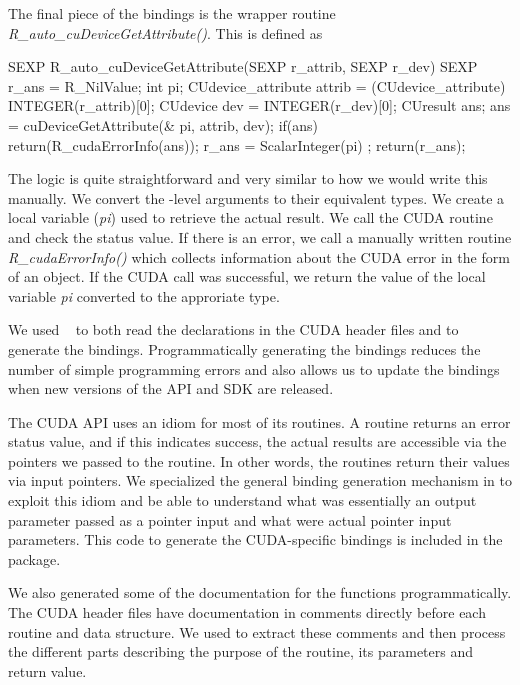 \documentclass[article]{jss}
\def\C{\proglang{C}}
\def\R{\proglang{R}}
\def\Rpkg#1{\pkg{#1}}
\def\Cfunc#1{\textit{#1()}}
\def\Cvar#1{\textit{#1}}
\begin{document}
The final piece of the bindings is the \C{} wrapper routine
\Cfunc{R\_auto\_cuDeviceGetAttribute}. This is defined as 
\begin{CCode}
SEXP
R_auto_cuDeviceGetAttribute(SEXP r_attrib, SEXP r_dev)
{
    SEXP r_ans = R_NilValue;
    int pi;
    CUdevice_attribute attrib = (CUdevice_attribute) INTEGER(r_attrib)[0];
    CUdevice dev = INTEGER(r_dev)[0];
    CUresult ans;
    ans = cuDeviceGetAttribute(& pi,  attrib,  dev);
    if(ans)
       return(R_cudaErrorInfo(ans));
    r_ans = ScalarInteger(pi) ;
    return(r_ans);
}
\end{CCode}
The logic is quite straightforward and very similar to how we would
write this manually. We convert the \R-level arguments to their
equivalent \C{} types.  We create a local variable (\Cvar{pi}) used to
retrieve the actual result.  We call the CUDA routine and check the
status value.  If there is an error, we call a manually written
routine \Cfunc{R\_cudaErrorInfo} which collects information about the
CUDA error in the form of an \R{} object.  If the CUDA call was
successful, we return the value of the local variable \Cvar{pi}
converted to the approriate \R{} type.



We used \Rpkg{RCIndex}~\cite{bib:RCIndex} to both read the
declarations in the CUDA header files and to generate the bindings.
Programmatically generating the bindings reduces the number of simple
programming errors and also allows us to update the bindings when new
versions of the API and SDK are released.

The CUDA API uses an idiom for most of its routines.  A routine
returns an error status value, and if this indicates success, the
actual results are accessible via the pointers we passed to the
routine. In other words, the routines return their values via input
pointers.  We specialized the general binding generation mechanism in
\Rpkg{RCIndex} to exploit this idiom and be able to understand what
was essentially an output parameter passed as a pointer input and what
were actual pointer input parameters.  This code to generate the
CUDA-specific bindings is included in the package.

We also generated some of the documentation for the \R{} functions
programmatically.  The CUDA header files have documentation in
comments directly before each routine and data structure.  We used
\Rpkg{RCIndex} to extract these comments and then process the
different parts describing the purpose of the routine, its parameters
and return value.
\end{document}
